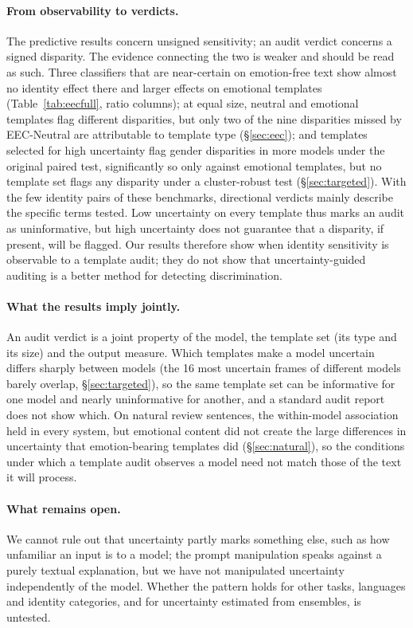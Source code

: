 \documentclass[runningheads]{llncs}
\begin{document}
\paragraph{From observability to verdicts.} The predictive results concern
unsigned sensitivity; an audit verdict concerns a signed disparity. The
evidence connecting the two is weaker and should be read as such. Three
classifiers that are near-certain on emotion-free text show almost no identity
effect there and larger effects on emotional templates (Table~\ref{tab:eecfull}, ratio columns);
at equal size, neutral and emotional templates flag different disparities, but
only two of the nine disparities missed by EEC-Neutral are attributable to
template type (\S\ref{sec:eec}); and templates selected for high uncertainty
flag gender disparities in more models under the original paired test,
significantly so only against emotional templates, but no template set flags
any disparity under a cluster-robust test (\S\ref{sec:targeted}). With the few
identity pairs of these benchmarks, directional verdicts mainly describe the
specific terms tested. Low uncertainty on every template
thus marks an audit as uninformative, but high uncertainty does not guarantee
that a disparity, if present, will be flagged. Our results therefore show when
identity sensitivity is observable to a template audit; they do not show that
uncertainty-guided auditing is a better method for detecting discrimination.

\paragraph{What the results imply jointly.} An audit verdict is a joint
property of the model, the template set (its type and its size) and the output
measure. Which templates make a model uncertain differs sharply between models
(the 16 most uncertain frames of different models barely overlap,
\S\ref{sec:targeted}), so the same template set can be informative for one model and nearly
uninformative for another, and a standard audit report does not show which. On
natural review sentences, the within-model association held in every system,
but emotional content did not create the large differences in uncertainty that
emotion-bearing templates did (\S\ref{sec:natural}), so the conditions under
which a template audit observes a model need not match those of the text it
will process.

\paragraph{What remains open.} We cannot rule out that uncertainty partly marks
something else, such as how unfamiliar an input is to a model; the prompt
manipulation speaks against a purely textual explanation, but we have not
manipulated uncertainty independently of the model. Whether the pattern holds
for other tasks, languages and identity categories, and for uncertainty
estimated from ensembles, is untested.
\end{document}
